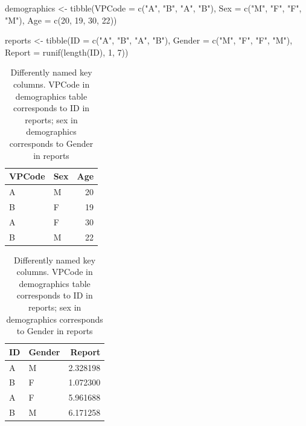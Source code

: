 \documentclass[
]{book}
\newenvironment{Shaded}{\begin{snugshade}}{\end{snugshade}}
\newcommand{\AttributeTok}[1]{\textcolor[rgb]{0.77,0.63,0.00}{#1}}
\newcommand{\DecValTok}[1]{\textcolor[rgb]{0.00,0.00,0.81}{#1}}
\newcommand{\FunctionTok}[1]{\textcolor[rgb]{0.00,0.00,0.00}{#1}}
\newcommand{\NormalTok}[1]{#1}
\newcommand{\OtherTok}[1]{\textcolor[rgb]{0.56,0.35,0.01}{#1}}
\newcommand{\StringTok}[1]{\textcolor[rgb]{0.31,0.60,0.02}{#1}}
\begin{document}
\begin{Shaded}
\begin{Highlighting}[]
\NormalTok{demographics }\OtherTok{\textless{}{-}} \FunctionTok{tibble}\NormalTok{(}\AttributeTok{VPCode =} \FunctionTok{c}\NormalTok{(}\StringTok{"A"}\NormalTok{, }\StringTok{"B"}\NormalTok{, }\StringTok{"A"}\NormalTok{, }\StringTok{"B"}\NormalTok{),}
                       \AttributeTok{Sex =} \FunctionTok{c}\NormalTok{(}\StringTok{"M"}\NormalTok{, }\StringTok{"F"}\NormalTok{, }\StringTok{"F"}\NormalTok{, }\StringTok{"M"}\NormalTok{),}
                       \AttributeTok{Age =} \FunctionTok{c}\NormalTok{(}\DecValTok{20}\NormalTok{, }\DecValTok{19}\NormalTok{, }\DecValTok{30}\NormalTok{, }\DecValTok{22}\NormalTok{))}

\NormalTok{reports }\OtherTok{\textless{}{-}} \FunctionTok{tibble}\NormalTok{(}\AttributeTok{ID =} \FunctionTok{c}\NormalTok{(}\StringTok{"A"}\NormalTok{, }\StringTok{"B"}\NormalTok{, }\StringTok{"A"}\NormalTok{, }\StringTok{"B"}\NormalTok{),}
                  \AttributeTok{Gender =} \FunctionTok{c}\NormalTok{(}\StringTok{"M"}\NormalTok{, }\StringTok{"F"}\NormalTok{, }\StringTok{"F"}\NormalTok{, }\StringTok{"M"}\NormalTok{),}
                  \AttributeTok{Report =} \FunctionTok{runif}\NormalTok{(}\FunctionTok{length}\NormalTok{(ID), }\DecValTok{1}\NormalTok{, }\DecValTok{7}\NormalTok{))}
\end{Highlighting}
\end{Shaded}

\begin{table}
\caption{\label{tab:unnamed-chunk-201}Differently named key columns. VPCode in demographics table corresponds to ID in reports; sex in demographics corresponds to Gender in reports}

\centering
\begin{tabular}[t]{l|l|r}
\hline
VPCode & Sex & Age\\
\hline
A & M & 20\\
\hline
B & F & 19\\
\hline
A & F & 30\\
\hline
B & M & 22\\
\hline
\end{tabular}
\centering
\begin{tabular}[t]{l|l|r}
\hline
ID & Gender & Report\\
\hline
A & M & 2.328198\\
\hline
B & F & 1.072300\\
\hline
A & F & 5.961688\\
\hline
B & M & 6.171258\\
\hline
\end{tabular}
\end{table}
\end{document}
